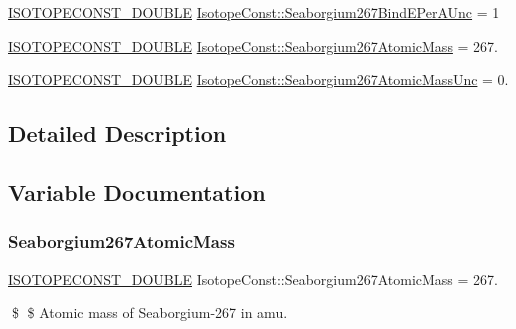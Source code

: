 \begin{DoxyCompactItemize}
\mbox{\hyperlink{group___isotope_const-_macros_ga8f45a7272ce02c0b4c65c44636ed719a}{I\+S\+O\+T\+O\+P\+E\+C\+O\+N\+S\+T\+\_\+\+D\+O\+U\+B\+LE}} \mbox{\hyperlink{group___isotope_const-_seaborgium-_sg267_ga07b68170d449345a3b6e5e8921818abb}{Isotope\+Const\+::\+Seaborgium267\+Bind\+E\+Per\+A\+Unc}} = 1
\item 
\mbox{\hyperlink{group___isotope_const-_macros_ga8f45a7272ce02c0b4c65c44636ed719a}{I\+S\+O\+T\+O\+P\+E\+C\+O\+N\+S\+T\+\_\+\+D\+O\+U\+B\+LE}} \mbox{\hyperlink{group___isotope_const-_seaborgium-_sg267_gac658f10f03c14ce8f1127cf1f497bea4}{Isotope\+Const\+::\+Seaborgium267\+Atomic\+Mass}} = 267.
\item 
\mbox{\hyperlink{group___isotope_const-_macros_ga8f45a7272ce02c0b4c65c44636ed719a}{I\+S\+O\+T\+O\+P\+E\+C\+O\+N\+S\+T\+\_\+\+D\+O\+U\+B\+LE}} \mbox{\hyperlink{group___isotope_const-_seaborgium-_sg267_ga1f199917dc2bc0491d0b6b46e96ea039}{Isotope\+Const\+::\+Seaborgium267\+Atomic\+Mass\+Unc}} = 0.
\end{DoxyCompactItemize}


\subsection{Detailed Description}


\subsection{Variable Documentation}
\mbox{\label{group___isotope_const-_seaborgium-_sg267_gac658f10f03c14ce8f1127cf1f497bea4}} 
\subsubsection{\texorpdfstring{Seaborgium267\+Atomic\+Mass}{Seaborgium267AtomicMass}}
{\footnotesize\ttfamily \mbox{\hyperlink{group___isotope_const-_macros_ga8f45a7272ce02c0b4c65c44636ed719a}{I\+S\+O\+T\+O\+P\+E\+C\+O\+N\+S\+T\+\_\+\+D\+O\+U\+B\+LE}} Isotope\+Const\+::\+Seaborgium267\+Atomic\+Mass = 267.}

\$ \$ Atomic mass of Seaborgium-\/267 in amu. \mbox{\label{group___isotope_const-_seaborgium-_sg267_ga1f199917dc2bc0491d0b6b46e96ea039}} 
